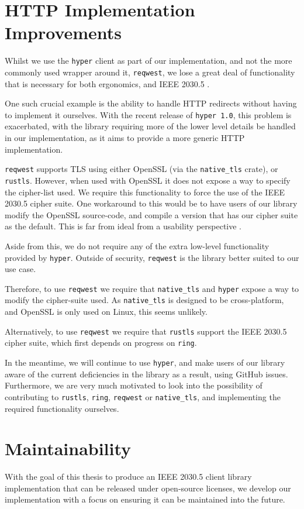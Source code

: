 \section{HTTP Implementation Improvements}
Whilst we use the \texttt{hyper} client as part of our implementation, and not the more commonly used wrapper around it, \texttt{reqwest}, we lose a great deal of functionality that is necessary for both ergonomics, and IEEE 2030.5 \cite{reqwest}. 

One such crucial example is the ability to handle HTTP redirects without having to implement it ourselves.
With the recent release of \texttt{hyper 1.0}, this problem is exacerbated, with the library requiring more of the lower level details be handled in our implementation, as it aims to provide a more generic HTTP implementation.   

\texttt{reqwest} supports TLS using either OpenSSL (via the \texttt{native\_tls} crate), or \texttt{rustls}. However, when used with OpenSSL it does not expose a way to specify the cipher-list used. We require this functionality to force the use of the IEEE 2030.5 cipher suite. One workaround to this would be to have users of our library modify the OpenSSL source-code, and compile a version that has our cipher suite as the default. This is far from ideal from a usability perspective \cite{reqwestopenssl}.

Aside from this, we do not require any of the extra low-level functionality provided by \texttt{hyper}. Outside of security, \texttt{reqwest} is the library better suited to our use case.

Therefore, to use \texttt{reqwest} we require that \texttt{native\_tls} and \texttt{hyper} expose a way to modify the cipher-suite used. As \texttt{native\_tls} is designed to be cross-platform, and OpenSSL is only used on Linux, this seems unlikely.

Alternatively, to use \texttt{reqwest} we require that \texttt{rustls} support the IEEE 2030.5 cipher suite, which first depends on progress on \texttt{ring}.

In the meantime, we will continue to use \texttt{hyper}, and make users of our library aware of the current deficiencies in the library as a result, using GitHub issues.
Furthermore, we are very much motivated to look into the possibility of contributing to \texttt{rustls}, \texttt{ring}, \texttt{reqwest} or \texttt{native\_tls}, and implementing the required functionality ourselves.


\section{Maintainability}
With the goal of this thesis to produce an IEEE 2030.5 client library implementation that can be released under open-source licenses, we develop our implementation with a focus on ensuring it can be maintained into the future. 

